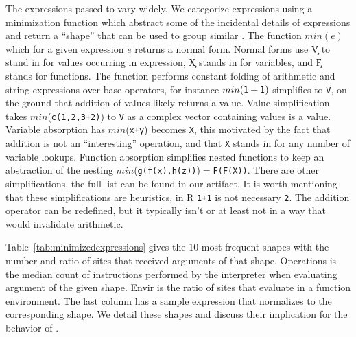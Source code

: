 \documentclass[screen,acmsmall]{acmart}%
\newcommand{\code}[1]{\lstinline |#1|\xspace}
\begin{document}
The expressions passed to \eval vary widely. We categorize expressions using a
minimization function which abstract some of the incidental details of
expressions and return a ``shape'' that can be used to group similar \evals. The
function $min(e)$ which for a given expression $e$ returns a normal form. Normal
forms use \c V to stand in for values occurring in expression, \c X stands in
for variables, and \c F stands for functions. The function performs constant
folding of arithmetic and string expressions over base operators, for instance
$min({\sf 1+1})$ simplifies to \code{V}, on the ground that addition of values
likely returns a value. Value simplification takes $min$(\code{c(1,2,3+2)}) to
\code{V} as a complex vector containing values is a value. Variable absorption
has $min$(\code{x+y}) becomes \code{X}, this motivated by the fact that addition is
not an ``interesting'' operation, and that \code{X} stands in for any number of
variable lookups. Function absorption simplifies nested functions to keep an
abstraction of the nesting $min$(\code{g(f(x),h(z))})$=$\code{F(F(X))}. There are other
simplifications, the full list can be found in our artifact. It is worth
mentioning that these simplifications are heuristics, in R \code{1+1} is not
necessary \code{2}. The addition operator can be redefined, but it typically isn't
or at least not in a way that would invalidate arithmetic.

Table~\ref{tab:minimizedexpressions} gives the 10 most frequent shapes with the
number and ratio of sites that received arguments of that shape. Operations is
the median count of instructions performed by the interpreter when evaluating
argument of the given shape. Envir is the ratio of sites that evaluate in a
function environment. The last column has a sample expression that normalizes to
the corresponding shape. We detail these shapes and discuss their implication for
the behavior of \eval.

\newcommand{\EE}[1]{{{\emph{\framebox{#1}}}}\\[1mm]}
\end{document}
